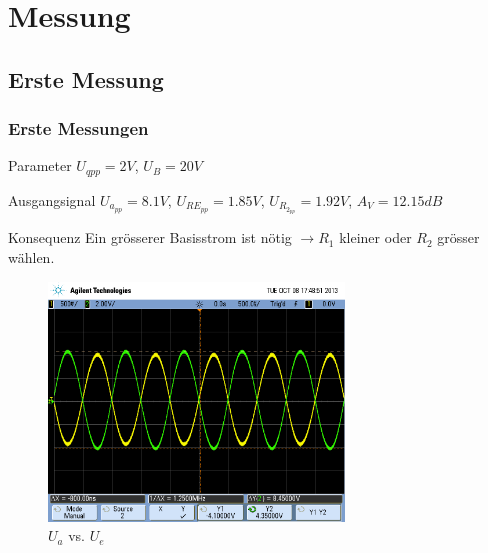 \section{Messung}

\subsection{Erste Messung}

\begin{frame}
	\frametitle{Erste Messungen}
	\begin{block}{Parameter}
	$U_{qpp} = 2V$, $U_B = 20V$
	\end{block}

	\begin{block}{Ausgangsignal}
	$U_{a_{pp}} = 8.1V$, $U_{RE_{pp}} = 1.85V$, $U_{R_{2_{pp}}} = 1.92V$,
	$A_V = 12.15dB$
	\end{block}

	\begin{alertblock}{Konsequenz}
	Ein grösserer Basisstrom ist nötig $\rightarrow R_1$ kleiner oder 
	$R_2$ grösser wählen.
	\end{alertblock}	
	
\end{frame}

\begin{frame}
	\begin{figure}
		\centering
		\includegraphics[width=0.7\textwidth]{scope_0.png}
		\caption{$U_a$ vs. $U_e$}
	\end{figure}
\end{frame}


